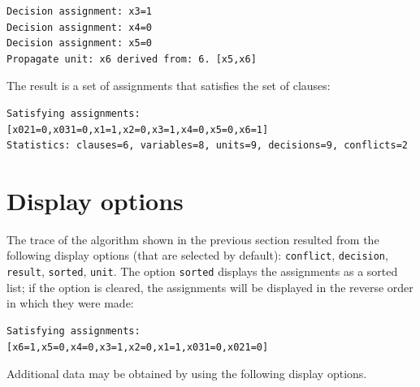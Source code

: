 \documentclass[11pt]{article}
\newcommand*{\p}[1]{\textup{\texttt{#1}}}
\begin{document}
\begin{verbatim}
Decision assignment: x3=1
Decision assignment: x4=0
Decision assignment: x5=0
Propagate unit: x6 derived from: 6. [x5,x6]
\end{verbatim}

The result is a set of assignments that satisfies the set of clauses:

\begin{verbatim}
Satisfying assignments:
[x021=0,x031=0,x1=1,x2=0,x3=1,x4=0,x5=0,x6=1]
Statistics: clauses=6, variables=8, units=9, decisions=9, conflicts=2
\end{verbatim}

\newpage

\section{Display options}

The trace of the algorithm shown in the previous section resulted from
the following display options (that are selected by default):
\p{conflict}, \p{decision}, \p{result}, \p{sorted}, \p{unit}. The option
\p{sorted} displays the assignments as a sorted list; if the option is
cleared, the assignments will be displayed in the reverse order in which
they were made:

\begin{verbatim}
Satisfying assignments:
[x6=1,x5=0,x4=0,x3=1,x2=0,x1=1,x031=0,x021=0]
\end{verbatim}

Additional data may be obtained by using the following display options.
\end{document}
